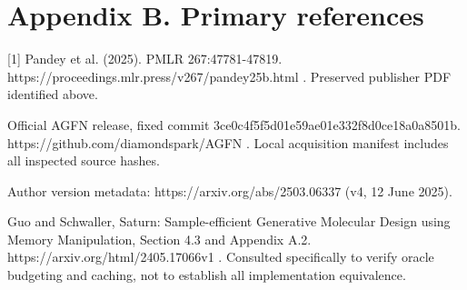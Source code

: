 \documentclass[10pt]{article}
\begin{document}
\section*{Appendix B. Primary references}
[1] Pandey et al. (2025). PMLR 267:47781-47819. https://proceedings.mlr.press/v267/pandey25b.html . Preserved publisher PDF identified above.\par
Official AGFN release, fixed commit 3ce0c4f5f5d01e59ae01e332f8d0ce18a0a8501b. https://github.com/diamondspark/AGFN . Local acquisition manifest includes all inspected source hashes.\par
Author version metadata: https://arxiv.org/abs/2503.06337 (v4, 12 June 2025).\par
Guo and Schwaller, Saturn: Sample-efficient Generative Molecular Design using Memory Manipulation, Section 4.3 and Appendix A.2. https://arxiv.org/html/2405.17066v1 . Consulted specifically to verify oracle budgeting and caching, not to establish all implementation equivalence.\par
\end{document}
